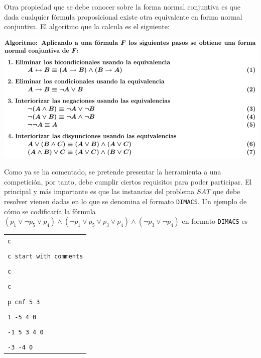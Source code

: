 Otra propiedad que se debe conocer sobre la forma normal conjuntiva es que dada cualquier fórmula proposicional existe otra equivalente en forma normal conjuntiva. El algoritmo \cite{apuntes} que la calcula es el siguiente:

\begin{center}
\includegraphics[scale=0.45]{imagenes/algfnc}
\end{center}

Como ya se ha comentado, se pretende presentar la herramienta a una competición, por tanto, debe cumplir ciertos requisitos para poder participar. El principal y más importante es que las instancias del problema $SAT$ que debe resolver vienen dadas en lo que se denomina el formato \texttt{DIMACS}. Un ejemplo de cómo se codificaría la fórmula $(p_1 \vee \neg p_5 \vee p_4)\wedge(\neg p_1 \vee p_5 \vee p_3 \vee p_4) \wedge (\neg p_3 \vee \neg p_4)$ en formato \texttt{DIMACS} es
\begin{table}[h]
\centering
\label{ej:dimacs}
\begin{tabular}{l}
{\Large \texttt{c} }\\\\
{\Large \texttt{c start with comments}} \\\\
{\Large \texttt{c}} \\\\
{\Large \texttt{c}}  \\\\
{\Large \texttt{p cnf 5 3}} \\\\
{\Large \texttt{1 -5 4 0}} \\\\
{\Large \texttt{-1 5 3 4 0}} \\\\
{\Large \texttt{-3 -4 0}}
\end{tabular}
\end{table}

